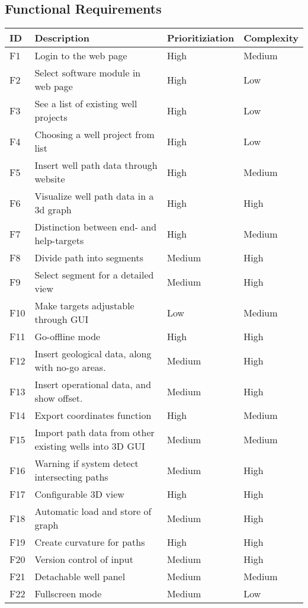 \documentclass{report}
\begin{document}
\subsection{Functional Requirements} \label{subsec:functional_requirements}
\begin{tabular}{| l | p{5.9cm} | l | l |} \hline
ID & Description & Prioritiziation & Complexity \\ \hline
F1 & Login to the web page& High & Medium \\ \hline
F2 & Select software module in web page& High & Low \\ \hline
F3 & See a list of existing well projects & High & Low \\ \hline
F4 & Choosing a well project from list & High & Low \\ \hline
F5 & Insert well path data through website & High & Medium \\ \hline
F6 & Visualize well path data in a 3d graph & High & High \\ \hline
F7 & Distinction between end- and help-targets & High & Medium \\ \hline %
F8 & Divide path into segments & Medium & High \\ \hline %
F9 & Select segment for a detailed view & Medium & High\\ \hline %
F10 & Make targets adjustable through GUI & Low & Medium\\ \hline %
F11 & Go-offline mode & High & High\\ \hline %
F12 & Insert geological data, along with no-go areas. & Medium & High \\ \hline %
F13 & Insert operational data, and show offset. & Medium & High\\ \hline %
F14 & Export coordinates function & High & Medium\\ \hline %
F15 & Import path data from other existing wells into 3D GUI & Medium & Medium\\ \hline %
F16 & Warning if system detect intersecting paths & Medium & High\\ \hline %
F17 & Configurable 3D view & High & High\\ \hline %
F18 & Automatic load and store of graph & Medium & High\\ \hline
F19 & Create curvature for paths & High & High \\ \hline%
F20 & Version control of input & Medium & High\\ \hline%
F21 & Detachable well panel & Medium & Medium\\ \hline %
F22 & Fullscreen mode & Medium & Low\\ \hline %
\end{tabular} 
\end{document}
